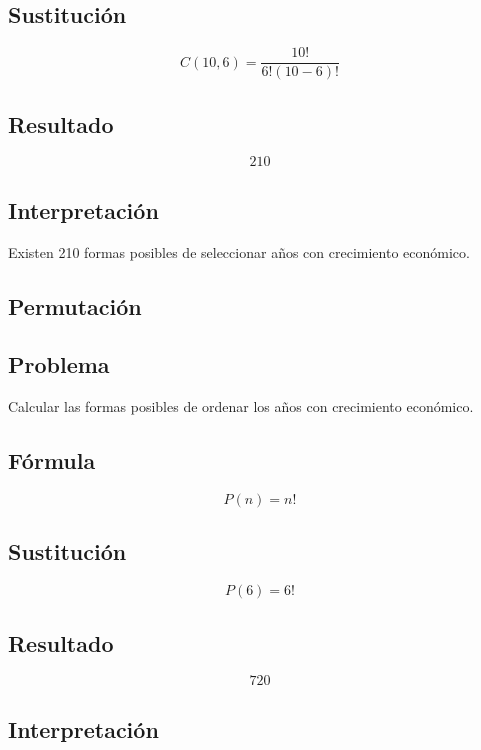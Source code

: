 \documentclass[12pt]{article}
\begin{document}
\subsection*{Sustitución}

\[
C(10,6)=\frac{10!}{6!(10-6)!}
\]

\subsection*{Resultado}

\[
210
\]

\subsection*{Interpretación}

Existen 210 formas posibles de seleccionar años con crecimiento económico.


\subsection{Permutación}

\subsection*{Problema}

Calcular las formas posibles de ordenar los años con crecimiento económico.

\subsection*{Fórmula}

\[
P(n)=n!
\]

\subsection*{Sustitución}

\[
P(6)=6!
\]

\subsection*{Resultado}

\[
720
\]

\subsection*{Interpretación}
\end{document}

